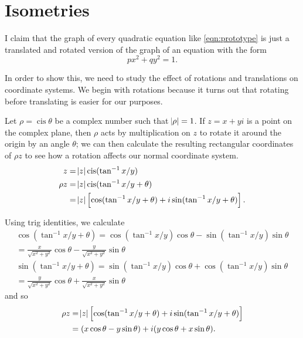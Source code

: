 \documentclass[a4paper,leqno]{article}
\numberwithin{equation}{section}
\theoremstyle{definition}
\theoremstyle{remark}
\DeclareMathOperator{\cis}{cis}
\begin{document}
\section{Isometries}
I claim that the graph of every quadratic equation like \ref{eqn:prototype} is just a translated and
rotated version of the graph of an equation with the form
\begin{equation}
  px^2 + qy^2 = 1.
\end{equation}

In order to show this, we need to study the effect of rotations and translations on coordinate systems. We
begin with rotations because it turns out that rotating before translating is easier for our purposes.

Let $ \rho = \cis \theta $ be a complex number such that $ \abs{\rho} = 1 $. If $ z = x + yi $ is a point on the complex plane,
then $ \rho $ acts by multiplication on $ z $ to rotate it around the origin by an angle $ \theta $; we can then calculate
the resulting rectangular coordinates of $ \rho z $ to see how a rotation affects our normal coordinate system.
\begin{align*}
  z &= \abs{z} \cis(\tan^{-1} x/y)\\
  \rho z &= \abs{z} \cis(\tan^{-1} x/y + \theta)\\
         &= \abs{z} \left[\cos(\tan^{-1} x/y + \theta) + i\sin(\tan^{-1} x/y + \theta)\right].
\end{align*}

Using trig identities, we calculate
\begin{align*}
  \cos(\tan^{-1} x/y + \theta) = \cos(\tan^{-1} x/y) \cos \theta - \sin(\tan^{-1} x/y) \sin \theta\\
                               = \frac{x}{\sqrt{x^2 + y^2}} \cos \theta - \frac{y}{\sqrt{x^2 + y^2}} \sin \theta\\
  \sin(\tan^{-1} x/y + \theta) = \sin(\tan^{-1} x/y) \cos \theta + \cos(\tan^{-1} x/y) \sin \theta\\
                               = \frac{y}{\sqrt{x^2 + y^2}} \cos \theta + \frac{x}{\sqrt{x^2 + y^2}} \sin \theta
\end{align*}
and so
\begin{align*}
  \rho z &= \abs{z} \left[\cos(\tan^{-1} x/y + \theta) + i\sin(\tan^{-1} x/y + \theta)\right]\\
         &= (x \cos \theta - y \sin \theta) + i(y \cos \theta + x \sin \theta).
\end{align*}
\end{document}
